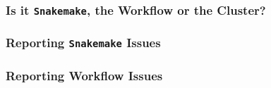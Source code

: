 \begin{frame}
  \frametitle{Is it \texttt{Snakemake}, the Workflow or the Cluster?}
	
	
\end{frame}

\begin{frame}
  \frametitle{Reporting \texttt{Snakemake} Issues}
	
	
\end{frame}

\begin{frame}
	\frametitle{Reporting Workflow Issues}
	
	
\end{frame}